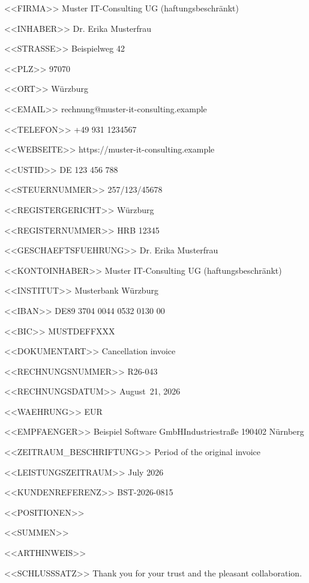 <<FIRMA>>
Muster IT-Consulting UG (haftungsbeschränkt)

<<INHABER>>
Dr. Erika Musterfrau

<<STRASSE>>
Beispielweg 42

<<PLZ>>
97070

<<ORT>>
Würzburg

<<EMAIL>>
rechnung@muster-it-consulting.example

<<TELEFON>>
+49 931 1234567

<<WEBSEITE>>
https://muster-it-consulting.example

<<USTID>>
DE 123 456 788

<<STEUERNUMMER>>
257/123/45678

<<REGISTERGERICHT>>
Würzburg

<<REGISTERNUMMER>>
HRB 12345

<<GESCHAEFTSFUEHRUNG>>
Dr. Erika Musterfrau

<<KONTOINHABER>>
Muster IT-Consulting UG (haftungsbeschränkt)

<<INSTITUT>>
Musterbank Würzburg

<<IBAN>>
DE89 3704 0044 0532 0130 00

<<BIC>>
MUSTDEFFXXX

<<DOKUMENTART>>
Cancellation invoice

<<RECHNUNGSNUMMER>>
R26-043

<<RECHNUNGSDATUM>>
August~21, 2026

<<WAEHRUNG>>
EUR

<<EMPFAENGER>>
Beispiel Software GmbH\zeilenwechsel{}Industriestraße 1\zeilenwechsel{}90402 Nürnberg

<<ZEITRAUM_BESCHRIFTUNG>>
Period of the original invoice

<<LEISTUNGSZEITRAUM>>
July 2026

<<KUNDENREFERENZ>>
BST-2026-0815

<<POSITIONEN>>
 \positionstrenner{}

<<SUMMEN>>
   \summentrenner{}

<<ARTHINWEIS>>

<<SCHLUSSSATZ>>
Thank you for your trust and the pleasant collaboration.
